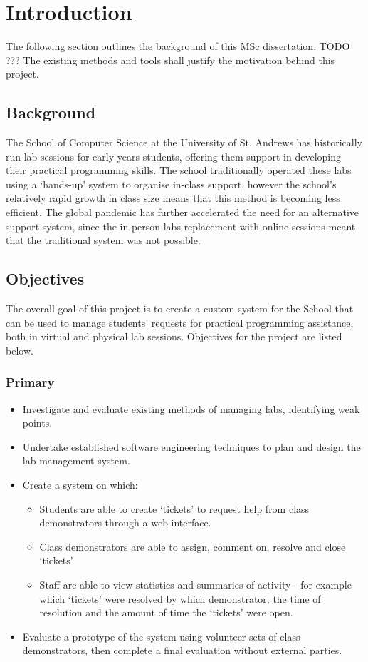 \chapter{Introduction}
The following section outlines the background of this MSc dissertation. TODO ??? The existing methods and tools shall justify the motivation behind this project. 

\section{Background}

The School of Computer Science at the University of St. Andrews has historically run lab sessions for early years students, offering them support in developing their practical programming skills. The school traditionally operated these labs using a ‘hands-up’ system to organise in-class support, however the school's relatively rapid growth in class size means that this method is becoming less efficient. The global pandemic has further accelerated the need for an alternative support system, since the in-person labs replacement with online sessions meant that the traditional system was not possible. 


\section{Objectives}

The overall goal of this project is to create a custom system for the School that can be used to manage students' requests for practical programming assistance, both in virtual and physical lab sessions. Objectives for the project are listed below.

\subsection{Primary}
\begin{itemize}
    \item Investigate and evaluate existing methods of managing labs, identifying weak points.
    \item Undertake established software engineering techniques to plan and design the lab management system.
    \item Create a system on which:
    \begin{itemize}
        \item Students are able to create `tickets' to request help from class demonstrators through a web interface.
        \item Class demonstrators are able to assign, comment on, resolve and close `tickets'.
        \item Staff are able to view statistics and summaries of activity - for example which `tickets' were resolved by which demonstrator, the time of resolution and the amount of time the `tickets' were open.
    \end{itemize}
    \item Evaluate a prototype of the system using volunteer sets of class demonstrators, then complete a final evaluation without external parties. 
    
\end{itemize}

